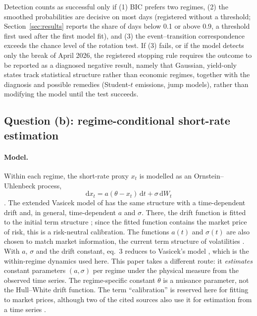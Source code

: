 \documentclass[11pt,a4paper]{article}
\begin{document}
Detection counts as successful only if (1) BIC prefers two regimes, (2) the smoothed probabilities are decisive on most days (registered without a threshold; Section~\ref{sec:results} reports the share of days below 0.1 or above 0.9, a threshold first used after the first model fit), and (3) the event--transition correspondence exceeds the chance level of the rotation test. If (3) fails, or if the model detects only the break of April 2026, the registered stopping rule requires the outcome to be reported as a diagnosed negative result, namely that Gaussian, yield-only states track statistical structure rather than economic regimes, together with the diagnosis and possible remedies (Student-$t$ emissions, jump models), rather than modifying the model until the test succeeds.

\subsection{Question (b): regime-conditional short-rate estimation}\label{sec:stage2}

\paragraph{Model.} Within each regime, the short-rate proxy $x_t$ is modelled as an Ornstein--Uhlenbeck process,
\begin{equation}
\mathrm{d}x_t=a(\theta-x_t)\,\mathrm{d}t+\sigma\,\mathrm{d}W_t
\end{equation}
\citep[eq.~47]{brigo2008}. The extended Vasicek model of \citet[eq.~3]{hullwhite1990} has the same structure with a time-dependent drift and, in general, time-dependent $a$ and $\sigma$. There, the drift function is fitted to the initial term structure \citep[eq.~16]{hullwhite1990}; since the fitted function contains the market price of risk, this is a risk-neutral calibration. The functions $a(t)$ and $\sigma(t)$ are also chosen to match market information, the current term structure of volatilities \citep[eq.~15, p.~578]{hullwhite1990}. With $a$, $\sigma$ and the drift constant, eq.~3 reduces to Vasicek's model \citep[p.~578]{hullwhite1990}, which is the within-regime dynamics used here. This paper takes a different route: it \emph{estimates} constant parameters $(a,\sigma)$ per regime under the physical measure from the observed time series. The regime-specific constant $\theta$ is a nuisance parameter, not the Hull--White drift function. The term ``calibration'' is reserved here for fitting to market prices, although two of the cited sources also use it for estimation from a time series \citetext{\citealp[p.~29]{brigo2008}; \citealp[p.~1]{vandenberg2011}}.
\end{document}
